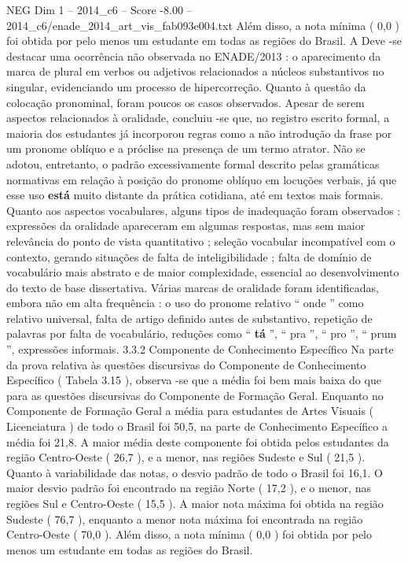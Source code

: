\begin{textsample}{NEG Dim 1 – 2014\_c6 – Score -8.00 – 2014\_c6/enade\_2014\_art\_vis\_fab093e004.txt}
Além disso, a nota mínima ( 0,0 ) foi obtida por pelo menos um estudante em todas as regiões do Brasil.
A Deve -se destacar uma ocorrência não observada no ENADE/2013 : o aparecimento da marca de plural em verbos ou adjetivos relacionados a núcleos substantivos no singular, evidenciando um processo de hipercorreção.
Quanto à questão da colocação pronominal, foram poucos os casos observados.
Apesar de serem aspectos relacionados à oralidade, concluiu -se que, no registro escrito formal, a maioria dos estudantes já incorporou regras como a não introdução da frase por um pronome oblíquo e a próclise na presença de um termo atrator.
Não se adotou, entretanto, o padrão excessivamente formal descrito pelas gramáticas normativas em relação à posição do pronome oblíquo em locuções verbais, já que esse uso \textbf{está} muito distante da prática cotidiana, até em textos mais formais.
Quanto aos aspectos vocabulares, alguns tipos de inadequação foram observados : expressões da oralidade apareceram em algumas respostas, mas sem maior relevância do ponto de vista quantitativo ; seleção vocabular incompatível com o contexto, gerando situações de falta de inteligibilidade ; falta de domínio de vocabulário mais abstrato e de maior complexidade, essencial ao desenvolvimento do texto de base dissertativa.
Várias marcas de oralidade foram identificadas, embora não em alta frequência : o uso do pronome relativo “ onde ” como relativo universal, falta de artigo definido antes de substantivo, repetição de palavras por falta de vocabulário, reduções como “ \textbf{tá} ”, “ pra ”, “ pro ”, “ prum ”, expressões informais. 3.3.2 Componente de Conhecimento Específico Na parte da prova relativa às questões discursivas do Componente de Conhecimento Específico ( Tabela 3.15 ), observa -se que a média foi bem mais baixa do que para as questões discursivas do Componente de Formação Geral.
Enquanto no Componente de Formação Geral a média para estudantes de Artes Visuais ( Licenciatura ) de todo o Brasil foi 50,5, na parte de Conhecimento Específico a média foi 21,8.
A maior média deste componente foi obtida pelos estudantes da região Centro-Oeste ( 26,7 ), e a menor, nas regiões Sudeste e Sul ( 21,5 ).
Quanto à variabilidade das notas, o desvio padrão de todo o Brasil foi 16,1.
O maior desvio padrão foi encontrado na região Norte ( 17,2 ), e o menor, nas regiões Sul e Centro-Oeste ( 15,5 ).
A maior nota máxima foi obtida na região Sudeste ( 76,7 ), enquanto a menor nota máxima foi encontrada na região Centro-Oeste ( 70,0 ).
Além disso, a nota mínima ( 0,0 ) foi obtida por pelo menos um estudante em todas as regiões do Brasil.

\end{textsample}

